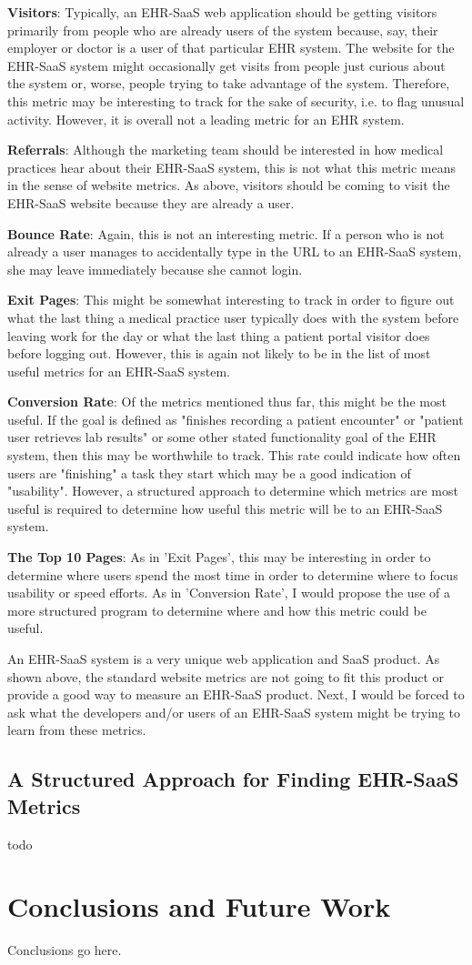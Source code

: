 \documentclass[10pt]{article}
\begin{document}
\textbf{Visitors}: Typically, an EHR-SaaS web application should be getting visitors primarily from people who are already users of the system because, say, their employer or doctor is a user of that particular EHR system.
The website for the EHR-SaaS system might occasionally get visits from people just curious about the system or, worse, people trying to take advantage of the system.
Therefore, this metric may be interesting to track for the sake of security, i.e. to flag unusual activity.
However, it is overall not a leading metric for an EHR system.

\textbf{Referrals}: Although the marketing team should be interested in how medical practices hear about their EHR-SaaS system, this is not what this metric means in the sense of website metrics.
As above, visitors should be coming to visit the EHR-SaaS website because they are already a user.

\textbf{Bounce Rate}: Again, this is not an interesting metric. If a person who is not already a user manages to accidentally type in the URL to an EHR-SaaS system, she may leave immediately because she cannot login.

\textbf{Exit Pages}: This might be somewhat interesting to track in order to figure out what the last thing a medical practice user typically does with the system before leaving work for the day or what the last thing a patient portal visitor does before logging out.
However, this is again not likely to be in the list of most useful metrics for an EHR-SaaS system.

\textbf{Conversion Rate}: Of the metrics mentioned thus far, this might be the most useful.
If the goal is defined as "finishes recording a patient encounter" or "patient user retrieves lab results" or some other stated functionality goal of the EHR system, then this may be worthwhile to track.
This rate could indicate how often users are "finishing" a task they start which may be a good indication of "usability".
However, a structured approach to determine which metrics are most useful is required to determine how useful this metric will be to an EHR-SaaS system.

\textbf{The Top 10 Pages}: As in 'Exit Pages', this may be interesting in order to determine where users spend the most time in order to determine where to focus usability or speed efforts.
As in 'Conversion Rate', I would propose the use of a more structured program to determine where and how this metric could be useful.

An EHR-SaaS system is a very unique web application and SaaS product.
As shown above, the standard website metrics are not going to fit this product or provide a good way to measure an EHR-SaaS product.
Next, I would be forced to ask what the developers and/or users of an EHR-SaaS system might be trying to learn from these metrics.

\subsection{A Structured Approach for Finding EHR-SaaS Metrics}
\label{sec:EHR-SaaS-GQM}

todo

\section{Conclusions and Future Work}

Conclusions go here. 



\end{document}
